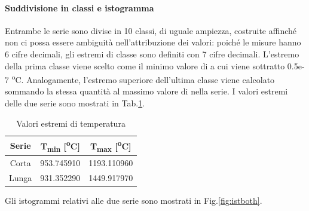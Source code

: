 \paragraph{Suddivisione in classi e istogramma}
Entrambe le serie sono divise in 10 classi, di uguale ampiezza, costruite affinché non ci possa essere ambiguità nell'attribuzione dei valori: poiché le misure hanno 6 cifre decimali, gli estremi di classe sono definiti con 7 cifre decimali. L'estremo della prima classe viene scelto come il minimo valore di  a cui viene sottratto 0.5e-7 \textsuperscript{o}C. Analogamente, l'estremo superiore dell'ultima classe viene calcolato sommando la stessa quantità al massimo valore di  nella serie. I valori estremi delle due serie sono mostrati in Tab.\ref{tab:estremitemp}.
\begin{table} [H]
	\centering
	\begin{tabular}{c|c|c}
		\toprule
		\toprule
		\textbf{Serie} & \textbf{T\textsubscript{min} [\textsuperscript{o}C]} &\textbf{T\textsubscript{max} [\textsuperscript{o}C]} \\
		\midrule
		\midrule
		Corta & 953.745910 & 1193.110960\\
		\midrule
		Lunga & 931.352290 & 1449.917970 \\
		\bottomrule
		\bottomrule
	\end{tabular}
\caption{Valori estremi di temperatura}
\label{tab:estremitemp}
\end{table}
Gli istogrammi relativi alle due serie sono mostrati in Fig.\ref{fig:istboth}.

